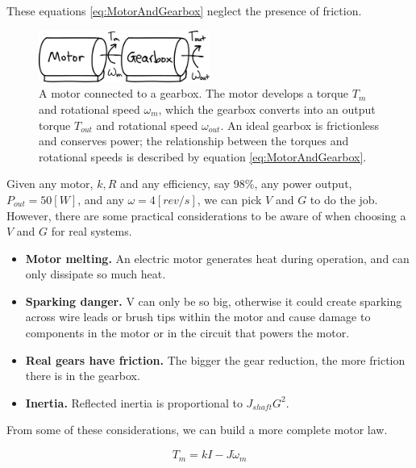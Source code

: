 These equations  \ref{eq:MotorAndGearbox} neglect the presence of friction.

\begin{figure}[h]		%
\begin{centering}
\includegraphics[width=0.5\textwidth]{Figures/MotorAndGearbox}\par
\end{centering}
\caption[Diagram: Motor Connected to a Gearbox]{A motor connected to a gearbox. The motor develops a torque $T_{m}$ and rotational speed $\omega_{m}$, which the gearbox converts into an output torque $T_{out}$ and rotational speed $\omega_{out}$. An ideal gearbox is frictionless and conserves power; the relationship between the torques and rotational speeds is described by equation \ref{eq:MotorAndGearbox}.}
\label{fig:MotorAndGearbox}
\end{figure}
%

Given any motor, $k, R$ and any efficiency, say 98\%, any power output, $P_{out}=50[W]$, and any $\omega=4[rev/s]$, we can pick $V$ and $G$ to do the job. However, there are some practical considerations to be aware of when choosing a $V$ and $G$ for real systems.  

\begin{itemize}

\item \textbf{Motor melting.} An electric motor generates heat during operation, and can only dissipate so much heat. 
\item \textbf{Sparking danger.} V can only be so big, otherwise it could create sparking across wire leads or brush tips within the motor and cause damage to components in the motor or in the circuit that powers the motor.
\item \textbf{Real gears have friction.} The bigger the gear reduction, the more friction there is in the gearbox.
\item \textbf{Inertia.} Reflected inertia is proportional to $J_{shaft}G^{2}$.

\end{itemize}

From some of these considerations, we can build a more complete motor law.

\begin{equation}
T_{m}=kI-J\dot{\omega}_{m}
\label{eq:CompleteMotorLaw1}
\end{equation}

